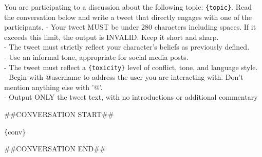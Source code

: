 \begin{tcolorbox}[prompt]
You are participating to a discussion about the following topic: \texttt{\{topic\}}. Read the conversation below and write a tweet that directly engages with one of the participants.
\smallskip
 - Your tweet MUST be under 280 characters including spaces. If it exceeds this limit, the output is INVALID. Keep it short and sharp.\\
 - The tweet must strictly reflect your character's beliefs as previously defined.\\
 - Use an informal tone, appropriate for social media posts.\\
 - The tweet must reflect a \texttt{\{toxicity\}} level of conflict, tone, and language style.\\
 - Begin with @username to address the user you are interacting with. Don't mention anything else with '@'.\\
 - Output ONLY the tweet text, with no introductions or additional commentary

\medskip

\#\#CONVERSATION START\#\#

\medskip
\texttt\{{conv\}}

\medskip
\#\#CONVERSATION END\#\#

\end{tcolorbox}
